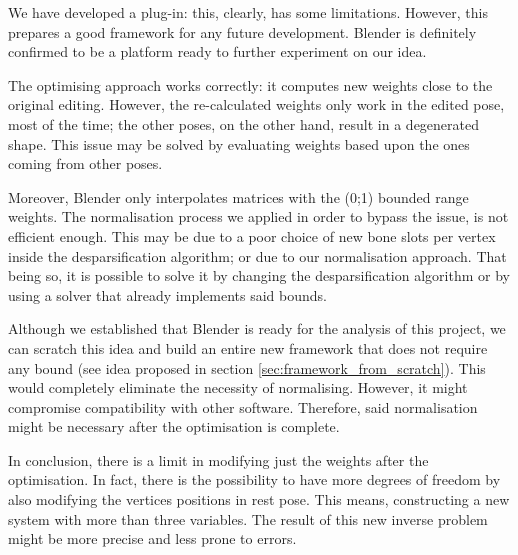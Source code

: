 \documentclass[12pt,twoside]{report}
\begin{document}
We have developed a plug-in: this, clearly, has some limitations. However, this prepares a good framework for any future development. Blender is definitely confirmed to be a platform ready to further experiment on our idea.

The optimising approach works correctly: it computes new weights close to the original editing. However, the re-calculated weights only work in the edited pose, most of the time; the other poses, on the other hand, result in a degenerated shape. This issue may be solved by evaluating weights based upon the ones coming from other poses.

Moreover, Blender only interpolates matrices with the (0;1) bounded range weights. The normalisation process we applied in order to bypass the issue, is not efficient enough. This may be due to a poor choice of new bone slots per vertex inside the desparsification algorithm; or due to our normalisation approach. That being so, it is possible to solve it by changing the desparsification algorithm or by using a solver that already implements said bounds.

Although we established that Blender is ready for the analysis of this project, we can scratch this idea and build an entire new framework that does not require any bound (see idea proposed in section \ref{sec:framework_from_scratch}). This would completely eliminate the necessity of normalising. However, it might compromise compatibility with other software. Therefore, said normalisation might be necessary after the optimisation is complete.

In conclusion, there is a limit in modifying just the weights after the optimisation. In fact, there is the possibility to have more degrees of freedom by also modifying the vertices positions in rest pose. This means, constructing a new system with more than three variables. The result of this new inverse problem might be more precise and less prone to errors.




\cleardoublepage
\end{document}
